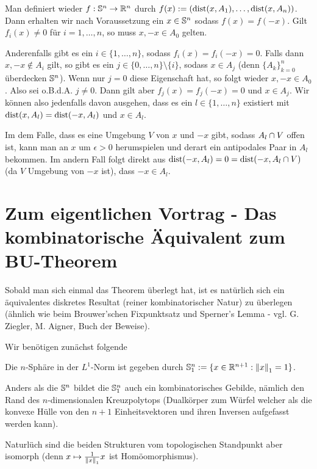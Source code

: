 \message{ !name(OnBorsukUlamsThoerem.tex)}\documentclass[10pt,a4paper]{article}
\begin{document}
Man definiert wieder $f:\mathbb{S}^n\rightarrow\mathbb{R}^n$ durch $f(x):=(\operatorname{dist}(x,A_1),\ldots,\operatorname{dist}(x,A_n))$. Dann erhalten wir nach Voraussetzung ein $x\in\mathbb{S}^n$ sodass $f(x)=f(-x)$. Gilt $f_i(x)\neq 0$ für $i=1,\ldots,n$, so muss $x,-x\in A_0$ gelten. 

Anderenfalls gibt es ein $i\in \{1,\ldots,n\}$, sodass $f_i(x)=f_i(-x)=0$. Falls dann $x,-x\not\in A_i$ gilt, so gibt es ein $j\in \{0,\ldots,n\}\setminus\{i\}$, sodass $x\in A_j$ (denn $\{A_k\}_{k=0}^n$ überdecken $\mathbb{S}^n$). Wenn nur $j=0$ diese Eigenschaft hat, so folgt wieder $x,-x\in A_0$. Also sei o.B.d.A. $j\neq 0$. Dann gilt aber $f_j(x)=f_j(-x)=0$ und $x\in A_j$. Wir können also jedenfalls davon ausgehen, dass es ein $l\in\{1,\ldots,n\}$ existiert mit $\operatorname{dist}(x,A_l)=\operatorname{dist}(-x,A_l)$ und $x\in A_l$. 

Im dem Falle, dass es eine Umgebung $V$ von $x$ und $-x$ gibt, sodass $A_l\cap V$ offen ist, kann man an $x$ um $\epsilon>0$ herumspielen und derart ein antipodales Paar in $A_l$ bekommen. Im andern Fall folgt direkt aus $\operatorname{dist}(-x,A_l)=0=\operatorname{dist}(-x,A_l\cap V)$ (da $V$ Umgebung von $-x$ ist), dass $-x\in A_l$.

\section{Zum eigentlichen Vortrag - Das kombinatorische Äquivalent zum BU-Theorem}

Sobald man sich einmal das Theorem überlegt hat, ist es natürlich sich ein äquivalentes diskretes Resultat (reiner kombinatorischer Natur) zu überlegen (ähnlich wie beim Brouwer'schen Fixpunktsatz und Sperner's Lemma - vgl. G. Ziegler, M. Aigner, Buch der Beweise).

Wir benötigen zunächst folgende

\begin{definition}
Die $n$-Sphäre in der $L^1$-Norm ist gegeben durch $\mathbb{S}^n_1:=\{x\in\mathbb{R}^{n+1}:\left\Vert x \right\Vert_1=1\}$.
\end{definition}

Anders als die $\mathbb{S}^n$ bildet die $\mathbb{S}^n_1$ auch ein kombinatorisches Gebilde, nämlich den Rand des $n$-dimensionalen Kreuzpolytops (Dualkörper zum Würfel welcher als die konvexe Hülle von den $n+1$ Einheitsvektoren und ihren Inversen aufgefasst werden kann).

Naturlüch sind die beiden Strukturen vom topologischen Standpunkt aber isomorph (denn $x\mapsto \frac{1}{\left\Vert x \right\Vert_1}x$ ist Homöomorphismus).
\end{document}
